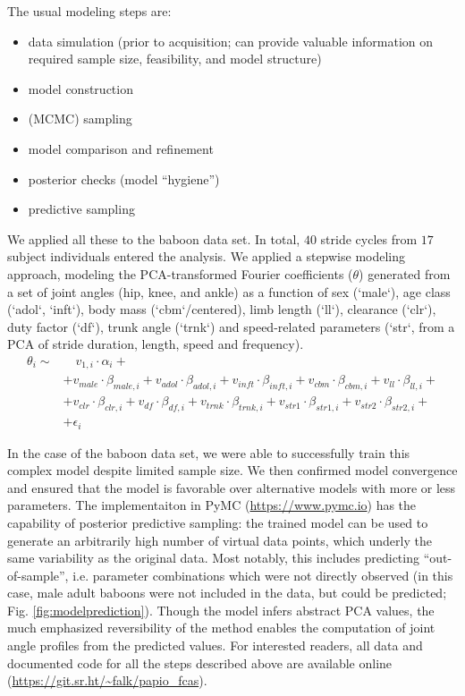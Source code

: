 The usual modeling steps are:
\begin{itemize}
\item data simulation (prior to acquisition; can provide valuable information on required sample size, feasibility, and model structure)
\item model construction
\item (MCMC) sampling
\item model comparison and refinement
\item posterior checks (model ``hygiene'')
\item predictive sampling
\end{itemize}


We applied all these to the baboon data set.
In total, \(40\) stride cycles from \(17\) subject individuals entered the analysis.
We applied a stepwise modeling approach, modeling the PCA-transformed Fourier coefficients (\(\theta\)) generated from a set of joint angles (hip, knee, and ankle) as a function of sex (`male`), age class (`adol`, `inft`), body mass (`cbm`/centered), limb length (`ll`), clearance (`clr`), duty factor (`df`), trunk angle (`trnk`) and speed-related parameters (`str`, from a PCA of stride duration, length, speed and frequency).
\begin{equation}
\begin{split}
 \theta_{i}  \sim &\quad v_{1,i}\cdot\alpha_{i} +
\\ & + v_{male}\cdot\beta_{male,i} + v_{adol}\cdot\beta_{adol,i} + v_{inft}\cdot\beta_{inft,i} + v_{cbm}\cdot\beta_{cbm,i}+ v_{ll}\cdot\beta_{ll,i} +
\\ & + v_{clr}\cdot\beta_{clr,i} + v_{df}\cdot\beta_{df,i} + v_{trnk}\cdot\beta_{trnk,i} + v_{str1}\cdot\beta_{str1,i} + v_{str2}\cdot\beta_{str2,i} +
\\ & + \epsilon_{i}
\end{split}
 \label{eq:jap} \end{equation}


In the case of the baboon data set, we were able to successfully train this complex model despite limited sample size.
We then confirmed model convergence and ensured that the model is favorable over alternative models with more or less parameters.
The implementaiton in PyMC (\url{https://www.pymc.io}) has the capability of posterior predictive sampling: the trained model can be used to generate an arbitrarily high number of virtual data points, which underly the same variability as the original data.
Most notably, this includes predicting ``out-of-sample'', i.e. parameter combinations which were not directly observed (in this case, male adult baboons were not included in the data, but could be predicted; Fig. \ref{fig:modelprediction}).
Though the model infers abstract PCA values, the much emphasized reversibility of the method enables the computation of joint angle profiles from the predicted values.
For interested readers, all data and documented code for all the steps described above are available online (\url{https://git.sr.ht/\~falk/papio\_fcas}).


